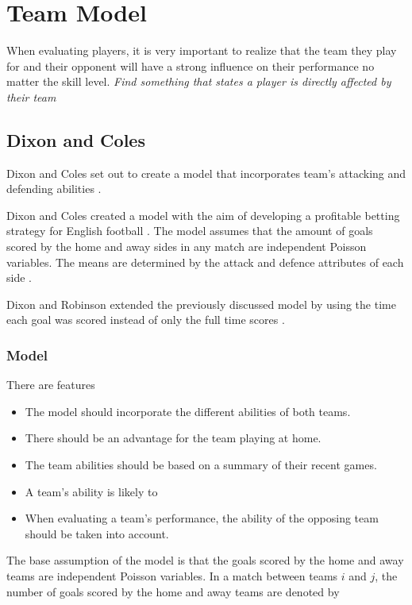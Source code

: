 \chapter{Team Model}\label{chapter:team_model}

When evaluating players, it is very important to realize that the team they play for and their opponent will have a strong influence on their performance no matter the skill level.
\textit{Find something that states a player is directly affected by their team}

\section{Dixon and Coles}
Dixon and Coles set out to create a model that incorporates team's attacking and defending abilities \cite{dixon_coles}.

Dixon and Coles created a model with the aim of developing a profitable betting strategy for English football \cite{dixon_coles}.  The model assumes that the amount of goals scored by the home and away sides in any match are independent Poisson variables.  The means are determined by the attack and defence attributes of each side \cite{dixon_coles}.

Dixon and Robinson extended the previously discussed model by using the time each goal was scored instead of only the full time scores \cite{dixon_robinson}. 

\subsection{Model}

There are features 

\begin{itemize}
	\item The model should incorporate the different abilities of both teams.
	\item There should be an advantage for the team playing at home.
	\item The team abilities should be based on a summary of their recent games.
	\item A team's ability is likely to 
	\item When evaluating a team's performance, the ability of the opposing team should be taken into account.
	
\end{itemize}

The base assumption of the model is that the goals scored by the home and away teams are independent Poisson variables.  In a match between teams $i$ and $j$, the number of goals scored by the home and away teams are denoted by

